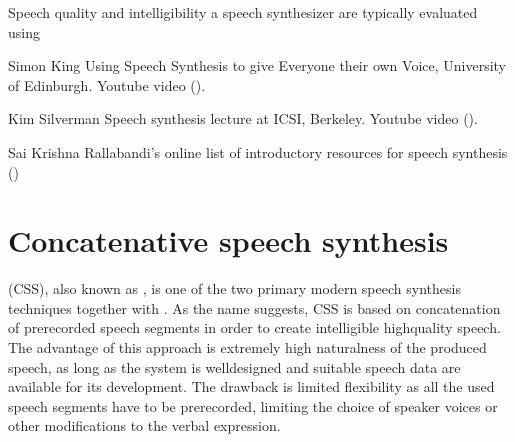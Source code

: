 \documentclass[letterpaper,10pt,english]{jupyterBook}
\begin{document}
\sphinxAtStartPar
Speech quality and intelligibility a speech synthesizer are typically
evaluated using 

\sphinxAtStartPar
{}

\sphinxAtStartPar
Simon King \sphinxhyphen{} Using Speech Synthesis to give Everyone their own Voice,
University of Edinburgh. Youtube video
(). 

\sphinxAtStartPar
Kim Silverman \sphinxhyphen{} Speech synthesis lecture at ICSI, Berkeley. Youtube
video ().

\sphinxAtStartPar
Sai Krishna Rallabandi’s on\sphinxhyphen{}line list of introductory resources for
speech synthesis
()

\sphinxstepscope


\section{Concatenative speech synthesis}
\label{\detokenize{Synthesis/Concatenative_speech_synthesis:concatenative-speech-synthesis}}\label{\detokenize{Synthesis/Concatenative_speech_synthesis::doc}}
\sphinxAtStartPar
{} (CSS), also known as , is one of the two primary modern speech synthesis
techniques together with {\hyperref[\detokenize{Synthesis/Statistical_parametric_speech_synthesis::doc}]{}}. As the name
suggests, CSS is based on concatenation of pre\sphinxhyphen{}recorded speech segments
in order to create intelligible high\sphinxhyphen{}quality speech. The advantage of
this approach is extremely high naturalness of the produced speech, as
long as the system is well\sphinxhyphen{}designed and suitable speech data are
available for its development. The drawback is limited flexibility as
all the used speech segments have to be pre\sphinxhyphen{}recorded, limiting the
choice of speaker voices or other modifications to the verbal
expression.
\end{document}
